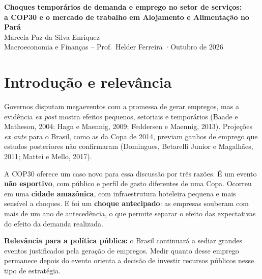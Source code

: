 \documentclass[11pt,a4paper]{article}
\begin{document}
\begin{center}
  {\Large\bfseries\color{azul} Choques temporários de demanda e emprego no setor de serviços:}\\[3pt]
  {\Large\bfseries\color{azul} a COP30 e o mercado de trabalho em Alojamento e Alimentação no Pará}\\[8pt]
  Marcela Paz da Silva Enriquez\\
  Macroeconomia e Finanças -- Prof.\ Helder Ferreira \quad·\quad Outubro de 2026
\end{center}

\vspace{4pt}
\noindent{}

\section{Introdução e relevância}

Governos disputam megaeventos com a promessa de gerar empregos, mas a evidência \textit{ex post}
mostra efeitos pequenos, setoriais e temporários (Baade e Matheson, 2004; Hagn e Maennig, 2009;
Feddersen e Maennig, 2013). Projeções \textit{ex ante} para o Brasil, como as da Copa de 2014,
previam ganhos de emprego que estudos posteriores não confirmaram (Domingues, Betarelli Junior e
Magalhães, 2011; Mattei e Mello, 2017).

A COP30 oferece um caso novo para essa discussão por três razões. É um evento \textbf{não esportivo},
com público e perfil de gasto diferentes de uma Copa. Ocorreu em uma \textbf{cidade amazônica}, com
infraestrutura hoteleira pequena e mais sensível a choques. E foi um \textbf{choque antecipado}: as
empresas souberam com mais de um ano de antecedência, o que permite separar o efeito das
expectativas do efeito da demanda realizada.

\textbf{Relevância para a política pública:} o Brasil continuará a sediar grandes eventos
justificados pela geração de empregos. Medir quanto desse emprego permanece depois do evento orienta
a decisão de investir recursos públicos nesse tipo de estratégia.
\end{document}

